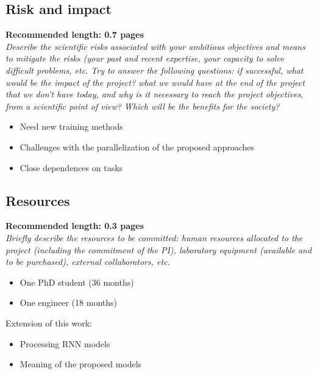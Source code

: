\subsection*{Risk and impact}
\textbf{Recommended length: 0.7 pages}\\

\textit{Describe the scientific risks associated with your ambitious objectives and means to mitigate the risks (your past and recent expertise, your capacity to solve difficult problems, etc. Try to answer the following questions: if successful, what would be the impact of the project? what we would have at the end of the project that we don't have today, and why is it necessary to reach the project objectives, from a scientific point of view? Which will be the benefits for the society?}

	\begin{itemize}
	\item Need new training methods
	\item Challenges with the parallelization of the proposed approaches
	\item Close dependences on tasks
\end{itemize}

\subsection*{Resources}
\textbf{Recommended length: 0.3 pages}\\

\textit{Briefly describe the resources to be committed: human resources allocated to the project (including the commitment of the PI), laboratory equipment (available and to be purchased), external collaborators, etc.}

\begin{itemize}
	\item One PhD student (36 months)
	\item One engineer (18 months)
\end{itemize}

Extension of this work:
\begin{itemize}
	\item Processing RNN models
	\item Meaning of the proposed models
\end{itemize}




